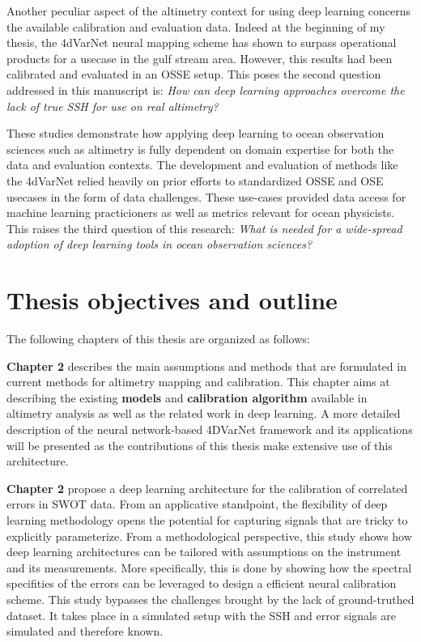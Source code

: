 \begin{bibunit}
Another peculiar aspect of the altimetry context for using deep learning concerns the available calibration and evaluation data.
Indeed at the beginning of my thesis, the 4dVarNet neural mapping scheme has shown to surpass operational products for a usecase in the gulf stream area\cite{fabletENDTOENDPHYSICSINFORMEDREPRESENTATION2021}. However, this results had been calibrated and evaluated in an OSSE setup. 
This poses the second question addressed in this manuscript is: \textit{How can deep learning approaches overcome the lack of true SSH for use on real altimetry?}


These studies demonstrate how applying deep learning to ocean observation sciences such as altimetry is fully dependent on domain expertise for both the data and evaluation contexts.
The development and evaluation of methods like the 4dVarNet relied heavily on prior efforts to standardized OSSE and OSE usecases in the form of data challenges\cite{ballarottaOceandatachallenges2020a_SSH_mapping_NATL60Material2020,ballarottaOceandatachallenges2021a_SSH_mapping_OSEMaterial2021}. These use-cases provided data access for machine learning practicioners as well as metrics relevant for ocean physicists. 
This raises the third question of this research: \textit{What is needed for a wide-spread adoption of deep learning tools in ocean observation sciences?}




\section{Thesis objectives and outline}

The following chapters of this thesis are organized as follows:

\textbf{Chapter 2} describes the main assumptions and methods that are formulated in current methods for altimetry mapping and calibration. This chapter aims at describing the existing \textbf{models} and \textbf{calibration algorithm} available in altimetry analysis as well as the related work in deep learning. A more detailed description of the neural network-based 4DVarNet framework and its applications will be presented as the contributions of this thesis make extensive use of this architecture.

\textbf{Chapter 2} propose a deep learning architecture for the calibration of correlated errors in SWOT data.
From an applicative standpoint, the flexibility of deep learning methodology opens the potential for capturing signals that are tricky to explicitly parameterize.
From a methodological perspective, this study shows how deep learning architectures can be tailored with assumptions on the instrument and its measurements.
More specifically, this is done by showing how the spectral specifities of the errors can be leveraged to design a efficient neural calibration scheme.
This study bypasses the challenges brought by the lack of ground-truthed dataset.
It takes place in a simulated setup with the SSH and error signals are simulated and therefore known.



\end{bibunit}
